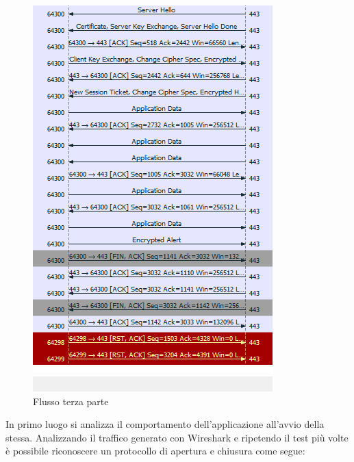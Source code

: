 \documentclass{article}
\begin{document}
\begin{figure}[!htb]
\begin{minipage}{0.3\textwidth}
    \includegraphics[width=0.9\linewidth]{flusso3.png}
    \caption{Flusso terza parte}\label{flux3}
\end{minipage}\hfill
\end{figure}

In primo luogo si analizza il comportamento dell'applicazione all'avvio della stessa. 
Analizzando il traffico generato con Wireshark e ripetendo il test più volte è possibile 
riconoscere un protocollo di apertura e chiusura come segue:
\end{document}
